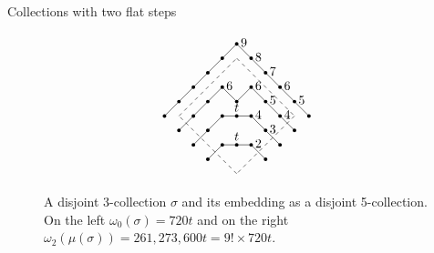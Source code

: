 \documentclass[12pt]{beamer}
\begin{document}
\begin{frame}[allowframebreaks]{Collections with two flat steps}
\begin{figure}
\begin{equation*}
\begin{tikzpicture}[scale=0.40]
	\node at (3,2) [circle, fill, inner sep=1pt]{};
	\node at (4,3) [circle, fill, inner sep=1pt]{};
	\node at (5,3) [circle, fill, inner sep=1pt]{};
	\node at (6,3) [circle, fill, inner sep=1pt]{};
	\node at (7,2) [circle, fill, inner sep=1pt]{};
	\draw (3,2) -- (4,3);
	\draw (4,3) -- node[above] {$t$} (6,3);
	\draw (6,3) -- node[above] {2} (7,2);
	
	\node at (2,3) [circle, fill, inner sep=1pt]{};
	\node at (3,4) [circle, fill, inner sep=1pt]{};
	\node at (4,5) [circle, fill, inner sep=1pt]{};
	\node at (5,5) [circle, fill, inner sep=1pt]{};
	\node at (6,5) [circle, fill, inner sep=1pt]{};
	\node at (7,4) [circle, fill, inner sep=1pt]{};
	\node at (8,3) [circle, fill, inner sep=1pt]{};
	\draw (2,3) -- (4,5);
	\draw (4,5) -- node[above] {$t$} (6,5);
	\draw (6,5) -- node[above] {4} (7,4);
	\draw (7,4) -- node[above] {3} (8,3);
	
	\node at (1,4) [circle, fill, inner sep=1pt]{};
	\node at (2,5) [circle, fill, inner sep=1pt]{};
	\node at (3,6) [circle, fill, inner sep=1pt]{};
	\node at (4,7) [circle, fill, inner sep=1pt]{};
	\node at (5,6) [circle, fill, inner sep=1pt]{};
	\node at (6,7) [circle, fill, inner sep=1pt]{};
	\node at (7,6) [circle, fill, inner sep=1pt]{};
	\node at (8,5) [circle, fill, inner sep=1pt]{};
	\node at (9,4) [circle, fill, inner sep=1pt]{};
	\draw (1,4) -- (4,7);
	\draw (4,7) -- node[above] {6} (5,6);
	\draw (5,6) -- (6,7);
	\draw (6,7) -- node[above] {6} (7,6);
	\draw (7,6) -- node[above] {5} (8,5);
	\draw (8,5) -- node[above] {4} (9,4);
	
	\node at (0,5) [circle, fill, inner sep=1pt]{};
	\node at (1,6) [circle, fill, inner sep=1pt]{};
	\node at (2,7) [circle, fill, inner sep=1pt]{};
	\node at (3,8) [circle, fill, inner sep=1pt]{};
	\node at (4,9) [circle, fill, inner sep=1pt]{};
	\node at (5,10) [circle, fill, inner sep=1pt]{};
	\node at (6,9) [circle, fill, inner sep=1pt]{};
	\node at (7,8) [circle, fill, inner sep=1pt]{};
	\node at (8,7) [circle, fill, inner sep=1pt]{};
	\node at (9,6) [circle, fill, inner sep=1pt]{};
	\node at (10,5) [circle, fill, inner sep=1pt]{};
	\draw (0,5) -- (5,10);
	\draw (5,10) -- node[above] {9} (6,9);
	\draw (6,9) -- node[above] {8} (7,8);
	\draw (7,8) -- node[above] {7} (8,7);
	\draw (8,7) -- node[above] {6} (9,6);
	\draw (9,6) -- node[above] {5} (10,5);
		
	\draw [dashed] (5,1) -- (1,5);
	\draw [dashed] (1,5) -- (5,9);
	\draw [dashed] (5,9) -- (9,5);
	\draw [dashed] (9,5) -- (5,1);
\end{tikzpicture}
\end{equation*}
\caption{\label{fig:embedded} A disjoint 3-collection $\sigma$ and its embedding as a disjoint 5-collection. On the left $\omega_0(\sigma) = 720t$ and on the right $\omega_2(\mu(\sigma)) = 261,273,600t = 9!\times720t$.}
\end{figure}


\end{frame}
\end{document}
